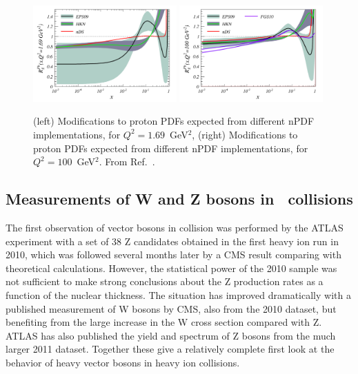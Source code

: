 \begin{figure}[t]
\begin{center}
\includegraphics[width=0.49\textwidth]{electroweak_figs/gluonsnew.pdf}
\includegraphics[width=0.49\textwidth]{electroweak_figs/gluonsnew100.pdf}
\caption[]{
(left) Modifications to proton PDFs expected from different nPDF implementations, for $Q^2=1.69$~GeV$^2$,
(right) Modifications to proton PDFs expected from different nPDF implementations, for $Q^2=100$~GeV$^2$.
From Ref.~\cite{Salgado:2011wc}.
}
\label{fig:pas:salgado}
\end{center}
\end{figure}

\subsection{Measurements of W and Z bosons in \PbPb\ collisions}

The first observation of vector bosons in \PbPb collision was performed by the ATLAS
experiment with a set of 38 Z candidates obtained in the first heavy ion run in 2010, which
was followed several months later by a CMS result comparing with theoretical calculations.
However, the statistical power of the 2010 sample was not sufficient to make strong conclusions
about the Z production rates as a function of the nuclear thickness.
The situation has improved dramatically with a published measurement of W bosons by CMS, also from the
2010 dataset, but benefiting from the large increase in the W cross section compared with Z.
ATLAS has also published the yield and spectrum of Z bosons from the much larger 2011 \PbPb dataset.
Together these give a relatively complete first look at the behavior of heavy vector bosons in
heavy ion collisions.


